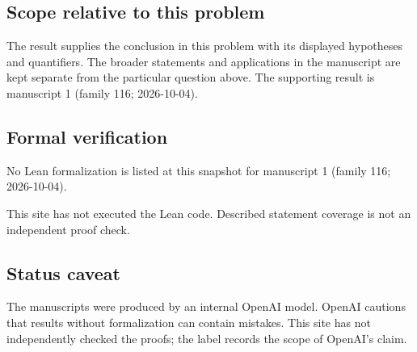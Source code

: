 \documentclass[11pt]{article}
\begin{document}
\subsection{Scope relative to this problem}
The result supplies the conclusion in this problem with its displayed hypotheses and quantifiers. The broader statements and applications in the manuscript are kept separate from the particular question above. The supporting result is manuscript 1 (family 116; 2026-10-04).

\subsection{Formal verification}
No Lean formalization is listed at this snapshot for manuscript 1 (family 116; 2026-10-04).

This site has not executed the Lean code. Described statement coverage is not an independent proof check.

\subsection{Status caveat}
The manuscripts were produced by an internal OpenAI model. OpenAI cautions that results without formalization can contain mistakes. This site has not independently checked the proofs; the label records the scope of OpenAI's claim.
\end{document}
